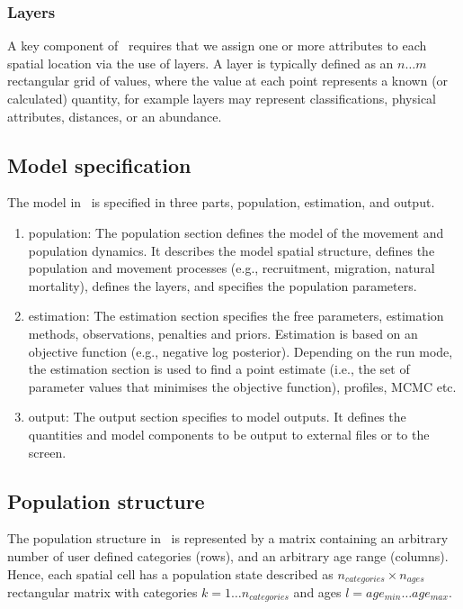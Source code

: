 \subsubsection{Layers}

A key component of \SPM\ requires that we assign one or more attributes to each spatial location via the use of layers. A layer is typically defined as an $n \ldots m$ rectangular grid of values, where the value at each point represents a known (or calculated) quantity, for example layers may represent classifications, physical attributes, distances, or an abundance. 

\subsection{Model specification}

The model in \SPM\ is specified in three parts, population, estimation, and output. 

\begin{enumerate}

\item population: The population section defines the model of the movement and population dynamics. It describes the model spatial structure, defines the population and movement processes (e.g., recruitment, migration, natural mortality), defines the layers, and specifies the population parameters.

\item estimation: The estimation section specifies the free parameters, estimation methods, observations, penalties and priors. Estimation is based on an objective function (e.g., negative log posterior). Depending on the run mode, the estimation section is used to find a point estimate (i.e., the set of parameter values that minimises the objective function), profiles, MCMC etc.

\item output: The output section specifies to model outputs. It defines the quantities and model components to be output to external files or to the screen.

\end{enumerate}

\subsection{Population structure}

The population structure in \SPM\ is represented by a matrix containing an arbitrary number of user defined categories (rows), and an arbitrary age range (columns). Hence, each spatial cell has a population state described as $n_{categories} \times n_{ages}$ rectangular matrix with categories $k=1 \ldots n_{categories}$ and ages $l=age_{min} \ldots age_{max}$. 

